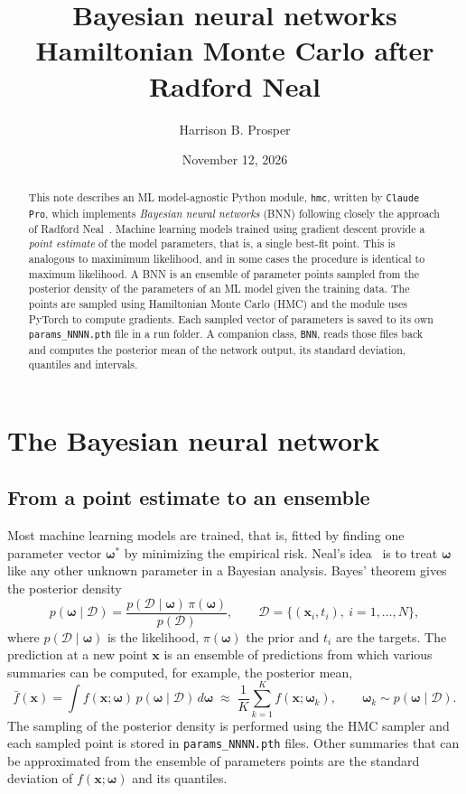 \documentclass[11pt]{article}
\title{\textbf{Bayesian neural networks}\\[4pt]
\large Hamiltonian Monte Carlo after Radford Neal}
\date{November 12, 2026}
\author{Harrison B. Prosper}
\newcommand{\file}[1]{\nolinkurl{#1}}
\newcommand{\code}[1]{\texttt{#1}}
\newcommand{\bw}{\boldsymbol{\omega}}
\newcommand{\bx}{\boldsymbol{x}}
\newcommand{\data}{\mathcal{D}}
\begin{document}
\maketitle

\begin{abstract}
\noindent
This note describes an ML model-agnostic Python module, \code{hmc}, written by \code{Claude Pro}, which implements \emph{Bayesian neural networks} (BNN) 
following closely the approach of Radford
Neal~\cite{neal1996,neal2011}. Machine learning models trained using gradient descent 
provide a \emph{point estimate} of the model parameters, that is, a single best-fit point. 
This is analogous to maximimum likelihood, and in some cases the procedure is identical to 
maximum likelihood. A BNN is
an ensemble of parameter points sampled from the posterior density of the parameters of an ML
model
given the training data. The points are sampled using Hamiltonian Monte Carlo (HMC)  and the module
uses PyTorch to compute gradients. Each sampled vector of parameters is saved 
to its own \file{params_NNNN.pth} file in a run folder. A companion class, \code{BNN},
reads those files back and computes the posterior mean of the network output, its
standard deviation, quantiles and intervals. 
\end{abstract}

\tableofcontents

\section{The Bayesian neural network}
\label{sec:bnn}

\subsection{From a point estimate to an ensemble}

Most machine learning models are trained, that is, fitted by finding  one parameter vector $\bw^*$ by minimizing the empirical
risk. Neal's
idea~\cite{neal1996} is to treat $\bw$ like any other unknown parameter in a
Bayesian analysis. Bayes' theorem gives the posterior density
\begin{equation}
  p(\bw \mid \data) = \frac{p(\data \mid \bw)\, \pi(\bw)}{p(\data)},
  \qquad \data = \{(\bx_i, t_i),\ i = 1,\ldots,N\},
  \label{eq:bayes}
\end{equation}
where $p(\data \mid \bw)$ is the likelihood, $\pi(\bw)$ the prior and $t_i$  are the targets. The prediction at a new point $\bx$ is an
ensemble of predictions from which various summaries can be computed, for example, 
 the posterior mean,
\begin{equation}
  \bar f(\bx) = \int f(\bx; \bw)\, p(\bw \mid \data)\, d\bw
  \;\approx\; \frac{1}{K} \sum_{k=1}^{K} f(\bx; \bw_k),
  \qquad \bw_k \sim p(\bw \mid \data).
  \label{eq:mean}
\end{equation}
The sampling of the posterior density is performed using the HMC sampler  and each sampled point
is stored
in \file{params_NNNN.pth} files. Other summaries that can be approximated from the ensemble
of parameters points are the standard deviation of
$f(\bx; \bw)$ and its quantiles.
\end{document}
